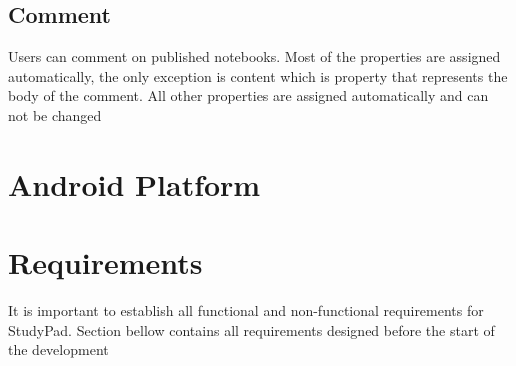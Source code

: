 \documentclass[thesis=B,english]{FITthesis}[2012/10/20]
\newcommand{\appname}{StudyPad}
\begin{document}
\subsection{Comment}
Users can comment on published notebooks. Most of the properties are assigned automatically, the only exception is content which is property that represents the body of the comment. All other properties are assigned automatically and can not be changed

\section{Android Platform}




\newpage
\section{Requirements}
It is important to establish all functional and non-functional requirements for \appname. Section bellow contains all requirements designed before the start
of the development
\end{document}
